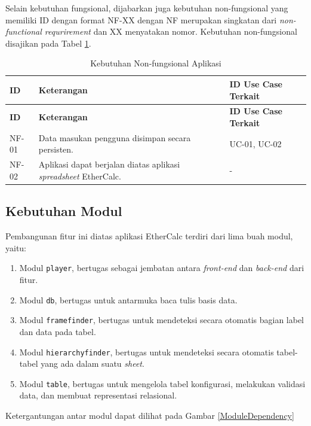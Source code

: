 	Selain kebutuhan fungsional, dijabarkan juga kebutuhan non-fungsional yang memiliki ID dengan format NF-XX dengan NF merupakan singkatan dari \textit{non-functional requrirement} dan XX menyatakan nomor. Kebutuhan non-fungsional disajikan pada Tabel \ref{KebutuhanNonfungsional}.

	\begin{small}
	\begin{longtable}{ | p{2cm} | p{6cm} | p{4cm} | }
	    \caption{Kebutuhan Non-fungsional Aplikasi}
	    \label{KebutuhanNonfungsional}\\ \hline
	    \centering\bfseries{ID} & \centering\bfseries{Keterangan} & \centering\bfseries{ID Use Case Terkait} \tabularnewline \hline
	    \endfirsthead
	    \hline
	    \centering\bfseries{ID} & \centering\bfseries{Keterangan} & \centering\bfseries{ID Use Case Terkait} \tabularnewline \hline
	    \endhead
	    NF-01 & Data masukan pengguna disimpan secara persisten. & UC-01, UC-02 \\ \hline
	    NF-02 & Aplikasi dapat berjalan diatas aplikasi \textit{spreadsheet} EtherCalc. & - \\ \hline
	\end{longtable}
	\end{small}

	\subsection{Kebutuhan Modul} \label{KebutuhanModul}
	Pembangunan fitur ini diatas aplikasi EtherCalc terdiri dari lima buah modul, yaitu:
	\begin{enumerate}
		\item Modul \texttt{player}, bertugas sebagai jembatan antara \textit{front-end} dan \textit{back-end} dari fitur.
		\item Modul \texttt{db}, bertugas untuk antarmuka baca tulis basis data.
		\item Modul \texttt{framefinder}, bertugas untuk mendeteksi secara otomatis bagian label dan data pada tabel.
		\item Modul \texttt{hierarchyfinder}, bertugas untuk mendeteksi secara otomatis tabel-tabel yang ada dalam suatu \textit{sheet}.
		\item Modul \texttt{table}, bertugas untuk mengelola tabel konfigurasi, melakukan validasi data, dan membuat representasi relasional.
	\end{enumerate}

	Ketergantungan antar modul dapat dilihat pada Gambar \ref{ModuleDependency}

